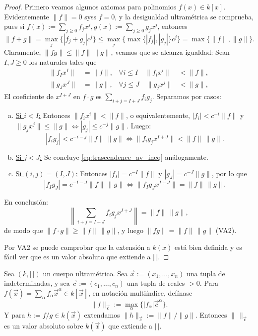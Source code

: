 \documentclass[teoria-numeros.tex]{subfiles}
\begin{document}
\begin{proof}
	Primero veamos algunos axiomas para polinomios $f(x) \in k[x]$.
	Evidentemente $\|f\| = 0$ syss $f = 0$, y la desigualdad ultramétrica se comprueba,
	pues si $f(x) := \sum_{j\ge 0} f_jx^j, g(x) := \sum_{j\ge 0} g_jx^j$, entonces
	$$ \|f+g\| = \max_j\{ |f_j + g_j|c^j \} \le \max_j\{ \max\{ |f_j|, |g_j| \}c^j \} = \max\{ \|f\|, \|g\| \}. $$
	Claramente, $\|fg\| \le \|f\| \, \|g\|$, veamos que se alcanza igualdad:
	Sean $I, J \ge 0$ los naturales tales que
	\begin{align*}
		\|f_I x^I\| &= \|f\|, & \forall i \le I \quad \|f_ix^i\| &< \|f\|, \\
		\|g_J x^J\| &= \|g\|, & \forall j \le J \quad \|g_jx^j\| &< \|g\|,
	\end{align*}
	El coeficiente de $x^{I+J}$ en $f\cdot g$ es $ \sum_{i+j=I+J} f_ig_j $.
	Separamos por casos:
	\begin{enumerate}[(a)]
		\item \underline{Si $i < I$:} Entonces $\|f_ix^i\| < \|f\|$, o equivalentemente, $|f_i| < c^{-i} \|f\|$ y
			$\|g_jx^j\| \le \|g\| \iff |g_j| \le c^{-j}\|g\|$. Luego:
			\begin{equation}
				|f_i g_j| < c^{-i-j}\|f\| \, \|g\| \iff \|f_ig_j x^{I+J}\| < \|f\| \, \|g\|.
				\label{eq:trascendence_av_ineq}
			\end{equation}

		\item \underline{Si $j < J$:} Se concluye \eqref{eq:trascendence_av_ineq} análogamente.
		\item \underline{Si $(i, j) = (I, J)$:} Entonces $|f_I| = c^{-I}\|f\|$ y $|g_J| = c^{-J}\|g\|$, por lo que
			$$ | f_I g_J | = c^{-I-J} \|f\|\,\|g\| \iff \|f_Ig_J x^{I+J}\| = \|f\| \, \|g\|. $$
	\end{enumerate}
	En conclusión:
	$$ \left\| \sum_{i+j = I+J} f_ig_j x^{I+J} \right\| = \|f\| \, \|g\|, $$
	de modo que $\|f\cdot g\| \ge \|f\| \, \|g\|$, y luego $\|fg\| = \|f\|\,\|g\|$ (VA2).

	Por VA2 se puede comprobar que la extensión a $k(x)$ está bien definida y es fácil ver que es un valor absoluto que extiende a $|\,|$.
\end{proof}

\begin{cor}
	Sea $(k, |\,|)$ un cuerpo ultramétrico.
	Sea $\vec x := (x_1, \dots, x_n)$ una tupla de indeterminadas, y sea $\vec c := (c_1, \dots, c_n)$ una tupla de reales $>0$.
	Para $f(\vec x) = \sum_{\alpha} f_\alpha \vec x^\alpha \in k[\vec x]$, en notación multiíndice, defínase
	$$ \|f\|_{\vec c} := \max_\alpha \{ |f_\alpha| \vec c^\alpha \}. $$
	Y para $h := f/g \in k(\vec x)$ extendamos $\|h\|_{\vec c} := \|f\|/\|g\|$.
	Entonces $\|\,\|_{\vec c}$ es un valor absoluto sobre $k(\vec x)$ que extiende a $|\,|$.
\end{cor}
\end{document}
